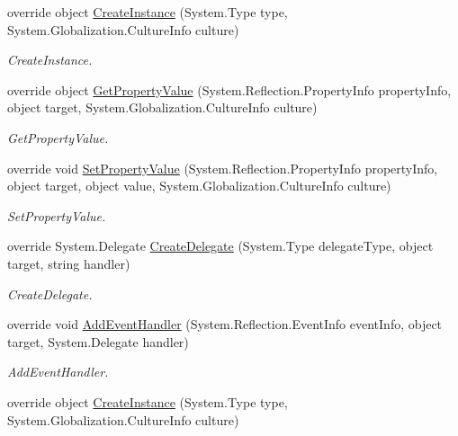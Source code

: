 \begin{DoxyCompactItemize}
override object \hyperlink{class_xaml_generated_namespace_1_1_generated_internal_type_helper_aefb7a98fceb9c287cef4756942f441d1}{CreateInstance} (System.Type type, System.Globalization.CultureInfo culture)
\begin{DoxyCompactList}\small\item\em CreateInstance. \item\end{DoxyCompactList}\item 
override object \hyperlink{class_xaml_generated_namespace_1_1_generated_internal_type_helper_afdc9fe15b56607d02082908d934480c6}{GetPropertyValue} (System.Reflection.PropertyInfo propertyInfo, object target, System.Globalization.CultureInfo culture)
\begin{DoxyCompactList}\small\item\em GetPropertyValue. \item\end{DoxyCompactList}\item 
override void \hyperlink{class_xaml_generated_namespace_1_1_generated_internal_type_helper_ade0f04c0f7b18dd5b170e071d5534d38}{SetPropertyValue} (System.Reflection.PropertyInfo propertyInfo, object target, object value, System.Globalization.CultureInfo culture)
\begin{DoxyCompactList}\small\item\em SetPropertyValue. \item\end{DoxyCompactList}\item 
override System.Delegate \hyperlink{class_xaml_generated_namespace_1_1_generated_internal_type_helper_a8ec4c37e82d9f4e867e9655f4eac3a78}{CreateDelegate} (System.Type delegateType, object target, string handler)
\begin{DoxyCompactList}\small\item\em CreateDelegate. \item\end{DoxyCompactList}\item 
override void \hyperlink{class_xaml_generated_namespace_1_1_generated_internal_type_helper_a73471f4a6d1ca4c4fceec9ad8610f0c8}{AddEventHandler} (System.Reflection.EventInfo eventInfo, object target, System.Delegate handler)
\begin{DoxyCompactList}\small\item\em AddEventHandler. \item\end{DoxyCompactList}\item 
override object \hyperlink{class_xaml_generated_namespace_1_1_generated_internal_type_helper_aefb7a98fceb9c287cef4756942f441d1}{CreateInstance} (System.Type type, System.Globalization.CultureInfo culture)

\end{DoxyCompactItemize}
